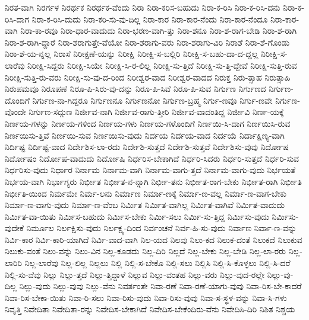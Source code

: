 {ನಿರತ-ವಾಗಿ
ನಿರರ್ಗಳ
ನಿರರ್ಥಕ
ನಿರರ್ಥಕ-ವೆಂದು
ನಿರಾ
ನಿರಾ-ಕರಿಸ-ಬಹುದು
ನಿರಾ-ಕ-ರಿಸಿ
ನಿರಾ-ಕ-ರಿಸಿ-ದನು
ನಿರಾ-ಕ-ರಿಸಿ-ದಾಗ
ನಿರಾ-ಕ-ರಿಸಿ-ದುದು
ನಿರಾ-ಕರಿ-ಸು-ವು-ದಿಲ್ಲ
ನಿರಾ-ಕಾರ
ನಿರಾ-ಕಾರ-ನೆಂದು
ನಿರಾ-ಕಾರ-ನೆಂದೂ
ನಿರಾ-ಕಾರ-ವಾಗಿ
ನಿರಾ-ಕಾ-ರವೂ
ನಿರಾ-ಧಾರ-ವಾದುದು
ನಿರಾ-ಭರಣ-ವಾಗಿ-ತ್ತು
ನಿರಾ-ಶನೂ
ನಿರಾ-ಶ-ರಾಗ-ಬೇಡಿ
ನಿರಾ-ಶ-ರಾಗಿ
ನಿರಾ-ಶ-ರಾಗಿ-ದ್ದಾರೆ
ನಿರಾ-ಶರಾಗುತ್ತೇ-ವೆಯೋ
ನಿರಾ-ಶರಾಗು-ವರು
ನಿರಾ-ಶರಾಗು-ವಿರಿ
ನಿರಾಶೆ
ನಿರಾ-ಶೆ-ಗೊಂಡು
ನಿರಾ-ಶೆ-ಯ-ನ್ನಲ್ಲ
ನಿರಾಸೆ
ನಿರೀಕ್ಷಣೆ-ಯನ್ನು
ನಿರೀಕ್ಷಿ
ನಿರೀಕ್ಷಿ-ಸ-ಬಲ್ಲಿರಿ
ನಿರೀಕ್ಷಿ-ಸ-ಬಹು-ದಾ-ದ-ದ್ದಲ್ಲ
ನಿರೀಕ್ಷಿ-ಸ-ಲಾರೆವು
ನಿರೀಕ್ಷಿ-ಸಿದ್ದರು
ನಿರೀಕ್ಷಿ-ಸಿಯೇ
ನಿರೀಕ್ಷಿ-ಸಿ-ರ-ಲಿಲ್ಲ
ನಿರೀಕ್ಷಿ-ಸು-ತ್ತಿದೆ
ನಿರೀಕ್ಷಿ-ಸು-ತ್ತಿ-ದ್ದೇವೆ
ನಿರೀಕ್ಷಿ-ಸುತ್ತಿ-ರುವ
ನಿರೀಕ್ಷಿ-ಸುತ್ತಿ-ರು-ವರು
ನಿರೀಕ್ಷಿ-ಸು-ವು-ದ-ರಿಂದ
ನಿರೀಶ್ವರ-ವಾದ
ನಿರೀಶ್ವರ-ವಾದದ
ನಿರುಕ್ತ
ನಿರು-ತ್ಸಾಹ
ನಿರುತ್ಸಾಹಿ
ನಿರುಪಮವೂ
ನಿರೂಪಣೆ
ನಿರೂ-ಪಿ-ಸಿರು-ವು-ದನ್ನು
ನಿರೂ-ಪಿ-ಸಿವೆ
ನಿರೂ-ಪಿ-ಸುವ
ನಿರ್ಗುಣ
ನಿರ್ಗುಣದ
ನಿರ್ಗುಣ-ದೊಂದಿಗೆ
ನಿರ್ಗುಣ-ನಾ-ಗಿದ್ದರೂ
ನಿರ್ಗುಣನೂ
ನಿರ್ಗುಣನೋ
ನಿರ್ಗುಣ-ಬ್ರಹ್ಮ
ನಿರ್ಗು-ಣವೂ
ನಿರ್ಗು-ಣವೇ
ನಿರ್ಗುಣ-ವೊಂದೇ
ನಿರ್ಗುಣ-ಸದ್ಗುಣ
ನಿರ್ಜೀವ-ನಾಗಿ
ನಿರ್ಜೀವ-ರಾಗು-ತ್ತೀರಿ
ನಿರ್ಜೀವ-ವಾದಂತಿದ್ದ
ನಿರ್ಜೀವಿ
ನಿರ್ಣ-ಯಕ್ಕೆ
ನಿರ್ಣಯ-ಗಳನ್ನು
ನಿರ್ಣಯ-ಗಳಿಂದ
ನಿರ್ಣಯ-ಗಳು
ನಿರ್ಣಯ-ಗಳೊಂದಿಗೆ
ನಿರ್ಣಯಿ-ಸಿ-ದಾಗ
ನಿರ್ಣಯಿಸಿ-ರುವ
ನಿರ್ಣಯಿಸು-ತ್ತಿವೆ
ನಿರ್ಣಯಿ-ಸುವ
ನಿರ್ಣಯಿಸು-ವುದು
ನಿರ್ದಯ
ನಿರ್ದಯ-ವಾದ
ನಿರ್ದಯೆ
ನಿರ್ದಾಕ್ಷಿಣ್ಯ-ವಾಗಿ
ನಿರ್ದಿಷ್ಟ
ನಿರ್ದಿಷ್ಟ-ವಾದ
ನಿರ್ದೇಶಿಸ-ಲಾ-ರದು
ನಿರ್ದೇಶಿ-ಸುತ್ತದೆ
ನಿರ್ದೇಶಿ-ಸುತ್ತವೆ
ನಿರ್ದೇಶಿಸು-ವುವು
ನಿರ್ದೋಷ
ನಿರ್ದೋಷಂ
ನಿರ್ದೋಷ-ವಾದುದು
ನಿರ್ದೋಷಿ
ನಿರ್ಧರಿಸ-ಬೇಕಾಗಿದೆ
ನಿರ್ಧರಿ-ಸಿದರು
ನಿರ್ಧರಿ-ಸುತ್ತದೆ
ನಿರ್ಧರಿ-ಸುವ
ನಿರ್ಧರಿಸು-ವುದು
ನಿರ್ಧಾರ
ನಿರ್ನಾಮ
ನಿರ್ನಾಮ-ವಾಗಿ
ನಿರ್ನಾಮ-ವಾಗು-ತ್ತದೆ
ನಿರ್ನಾಮ-ವಾಗು-ವುದು
ನಿರ್ಭಯತೆ
ನಿರ್ಭಯ-ವಾಗಿ
ನಿರ್ಭಾಗ್ಯರು
ನಿರ್ಭೀತ
ನಿರ್ಭೀತ-ನ-ನ್ನಾಗಿ
ನಿರ್ಭೀ-ತನು
ನಿರ್ಭೀತ-ರಾಗ-ಬೇಕು
ನಿರ್ಭೀತ-ರಾಗಿ
ನಿರ್ಭೀತಿ
ನಿರ್ಭೀತಿ-ಯಿಂದ
ನಿರ್ಮಮೇ
ನಿರ್ಮ-ಲನು
ನಿರ್ಮಾಣ
ನಿರ್ಮಾ-ಣಕ್ಕೆ
ನಿರ್ಮಾ-ಣ-ವಲ್ಲ
ನಿರ್ಮಾ-ಣ-ವಾಗ-ಬೇಕು
ನಿರ್ಮಾ-ಣ-ವಾಗು-ವುದು
ನಿರ್ಮಾ-ಣ-ವೆಂಬ
ನಿರ್ಮಿತ
ನಿರ್ಮಿತ-ವಾಗಿಲ್ಲ
ನಿರ್ಮಿತ-ವಾಗಿವೆ
ನಿರ್ಮಿತ-ವಾದುದು
ನಿರ್ಮಿತ-ವಾ-ಯಿತು
ನಿರ್ಮಿಸ-ಬಹುದು
ನಿರ್ಮಿಸ-ಬೇಕು
ನಿರ್ಮಿ-ಸಲು
ನಿರ್ಮಿ-ಸು-ತ್ತಿದ್ದ
ನಿರ್ಮಿಸು-ವುದು
ನಿರ್ಮಿಸು-ವುದೇಕೆ
ನಿರ್ಮೂಲ
ನಿರ್ಲಕ್ಷಿಸು-ವುದು
ನಿರ್ಲಕ್ಷ್ಯ-ದಿಂದ
ನಿರ್ವಂಚನೆ
ನಿರ್ವ-ಹಿ-ಸು-ವುದು
ನಿರ್ವಾಣ
ನಿರ್ವಾ-ಣ-ವನ್ನು
ನಿರ್ವಿ-ಕಾರ
ನಿರ್ವಿ-ಕಾರಿ-ಯಾಗಿದೆ
ನಿರ್ವಿ-ವಾದ-ವಾಗಿ
ನಿಲ-ಯದ
ನಿಲವು
ನಿಲು-ಕದ
ನಿಲುಕ-ದಂತೆ
ನಿಲುಕದೆ
ನಿಲುಕುವ
ನಿಲುಕು-ವಂತೆ
ನಿಲು-ವನ್ನು
ನಿಲು-ವಿನ
ನಿಲ್ಲ-ಕೂಡದು
ನಿಲ್ಲ-ದಿರಿ
ನಿಲ್ಲದೆ
ನಿಲ್ಲ-ಬೇಕು
ನಿಲ್ಲ-ಬೇಡಿ
ನಿಲ್ಲ-ಲಾ-ರರು
ನಿಲ್ಲ-ಲಾರಿರಿ
ನಿಲ್ಲ-ಲಾರೆವು
ನಿಲ್ಲ-ಲಿಲ್ಲ
ನಿಲ್ಲಲು
ನಿಲ್ಲಿ
ನಿಲ್ಲಿ-ಸ-ಬೇಕೊ
ನಿಲ್ಲಿ-ಸಲು
ನಿಲ್ಲಿಸಿ
ನಿಲ್ಲಿ-ಸಿ-ಕೊಳ್ಳಲು
ನಿಲ್ಲಿ-ಸಿ-ದರೆ
ನಿಲ್ಲಿ-ಸು-ವೆವು
ನಿಲ್ಲು
ನಿಲ್ಲು-ತ್ತದೆ
ನಿಲ್ಲು-ತ್ತಿದ್ದಾಳೆ
ನಿಲ್ಲುವ
ನಿಲ್ಲು-ವಂತಹ
ನಿಲ್ಲು-ವರು
ನಿಲ್ಲು-ವುದ-ರಲ್ಲೇ
ನಿಲ್ಲು-ವು-ದಿಲ್ಲ
ನಿಲ್ಲು-ವುದು
ನಿಲ್ಲು-ವುವು
ನಿಲ್ಲು-ವೆನು
ನಿವರ್ತಂತೇ
ನಿವಾ-ರಣೆ
ನಿವಾ-ರಣೆ-ಯಾಗು-ವುವು
ನಿವಾ-ರಿಸ-ಬೇ-ಕಾದರೆ
ನಿವಾ-ರಿಸ-ಬೇಕಾ-ಯಿತು
ನಿವಾ-ರಿ-ಸಲು
ನಿವಾ-ರಿಸು-ವುದು
ನಿವಾ-ರಿಸು-ವುವು
ನಿವಾ-ಸ-ಸ್ಥಳ-ವನ್ನು
ನಿವಾ-ಸಿ-ಗಳು
ನಿವೃತ್ತಿ
ನಿವೇದಿತಾ
ನಿವೇದಿತಾ-ರನ್ನು
ನಿವೇದಿಸ-ಬೇಕಾಗಿದೆ
ನಿವೇದಿಸ-ಬೇಕೆಂದಿರು-ವೆನು
ನಿವೇದಿಸಿ-ದಿರಿ
ನಿಶಿತ
ನಿಶ್ಚಯ
}
